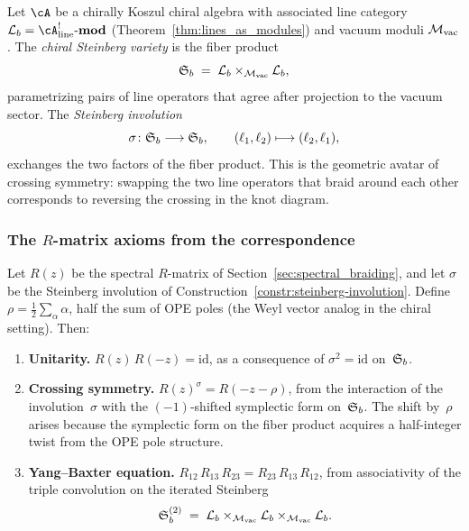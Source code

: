 \begin{construction}
\label{constr:steinberg-involution}
Let $\cA$ be a chirally Koszul chiral algebra with associated
line category
$\mathcal{L}_b = \cA^!_{\mathrm{line}}\text{-}\mathbf{mod}$
(Theorem~\ref{thm:lines_as_modules}) and vacuum moduli
${\mathcal{M}_{\mathrm{vac}}}$. The \emph{chiral Steinberg variety} is the fiber
product
\[
\mathfrak{S}_b \;=\; \mathcal{L}_b \times_{{\mathcal{M}_{\mathrm{vac}}}} \mathcal{L}_b,
\]
parametrizing pairs of line operators that agree after
projection to the vacuum sector. The \emph{Steinberg
involution}
\[
\sigma \colon \mathfrak{S}_b \longrightarrow \mathfrak{S}_b,
\qquad
(\ell_1, \ell_2) \longmapsto (\ell_2, \ell_1),
\]
exchanges the two factors of the fiber product. This is the
geometric avatar of crossing symmetry: swapping the two line
operators that braid around each other corresponds to reversing
the crossing in the knot diagram.
\end{construction}

\subsubsection{The $R$-matrix axioms from the correspondence}

\begin{conjecture}
\label{conj:R-matrix-steinberg}
Let $R(z)$ be the spectral $R$-matrix of
Section~\ref{sec:spectral_braiding}, and let $\sigma$ be the
Steinberg involution of
Construction~\ref{constr:steinberg-involution}. Define
$\rho = \tfrac{1}{2}\sum_{\alpha} \alpha$, half the sum of OPE
poles (the Weyl vector analog in the chiral setting). Then:
\begin{enumerate}
\item \textbf{Unitarity.}
$R(z)\,R(-z) = \mathrm{id}$, as a consequence of
$\sigma^2 = \mathrm{id}$ on~$\mathfrak{S}_b$.

\item \textbf{Crossing symmetry.}
$R(z)^{\sigma} = R(-z - \rho)$, from the interaction of the
involution~$\sigma$ with the $(-1)$-shifted symplectic form
on~$\mathfrak{S}_b$. The shift by~$\rho$ arises because the
symplectic form on the fiber product acquires a half-integer
twist from the OPE pole structure.

\item \textbf{Yang--Baxter equation.}
$R_{12}\,R_{13}\,R_{23} = R_{23}\,R_{13}\,R_{12}$, from
associativity of the triple convolution on the iterated
Steinberg
\[
\mathfrak{S}_b^{(2)} \;=\;
\mathcal{L}_b \times_{{\mathcal{M}_{\mathrm{vac}}}} \mathcal{L}_b
\times_{{\mathcal{M}_{\mathrm{vac}}}} \mathcal{L}_b.
\]
\end{enumerate}
\end{conjecture}

